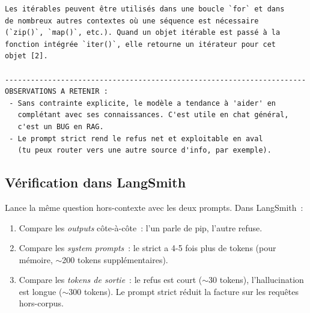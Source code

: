 \documentclass[11pt,a4paper]{article}
\begin{document}
\begin{tcolorbox}[
  colback=white,
  colframe=black!50,
  coltitle=black,
  fonttitle=\footnotesize\bfseries,
  fontupper=\footnotesize,
  title=Sortie de l'exécution,
  breakable,
]
\begin{verbatim}
Les itérables peuvent être utilisés dans une boucle `for` et dans
de nombreux autres contextes où une séquence est nécessaire
(`zip()`, `map()`, etc.). Quand un objet itérable est passé à la
fonction intégrée `iter()`, elle retourne un itérateur pour cet
objet [2].

----------------------------------------------------------------------
OBSERVATIONS A RETENIR :
 - Sans contrainte explicite, le modèle a tendance à 'aider' en
   complétant avec ses connaissances. C'est utile en chat général,
   c'est un BUG en RAG.
 - Le prompt strict rend le refus net et exploitable en aval
   (tu peux router vers une autre source d'info, par exemple).
\end{verbatim}
\end{tcolorbox}

\subsection{Vérification dans LangSmith}

Lance la même question hors-contexte avec les deux prompts. Dans
LangSmith~:
\begin{enumerate}[leftmargin=*]
  \item Compare les \emph{outputs} côte-à-côte~: l'un parle de pip,
        l'autre refuse.
  \item Compare les \emph{system prompts}~: le strict a 4-5 fois plus
        de tokens (pour mémoire, $\sim$200 tokens supplémentaires).
  \item Compare les \emph{tokens de sortie}~: le refus est court ($\sim$30
        tokens), l'hallucination est longue ($\sim$300 tokens). Le prompt
        strict réduit la facture sur les requêtes hors-corpus.
\end{enumerate}
\end{document}
